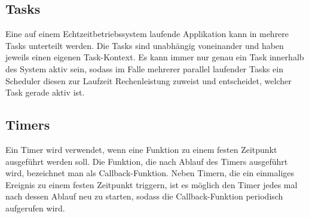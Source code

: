 \subsection{Tasks}\label{subsec:Tasks}
Eine auf einem Echtzeitbetriebssystem laufende Applikation kann in mehrere Tasks unterteilt werden. Die Tasks sind unabhängig voneinander und haben jeweils einen eigenen Task-Kontext. Es kann immer nur genau ein Task innerhalb des System aktiv sein, sodass im Falle mehrerer parallel laufender Tasks ein Scheduler diesen zur Laufzeit Rechenleistung zuweist und entscheidet, welcher Task gerade aktiv ist. ~\cite{FreeRTOS.Tasks}
\subsection{Timers}\label{subsec:Timers}
Ein Timer wird verwendet, wenn eine Funktion zu einem festen Zeitpunkt ausgeführt werden soll. Die Funktion, die nach Ablauf des Timers ausgeführt wird, bezeichnet man als Callback-Funktion. Neben Timern, die ein einmaliges Ereignis zu einem festen Zeitpunkt triggern, ist es möglich den Timer jedes mal nach dessen Ablauf neu zu starten, sodass die Callback-Funktion periodisch aufgerufen wird. ~\cite{FreeRTOS.Timers}

